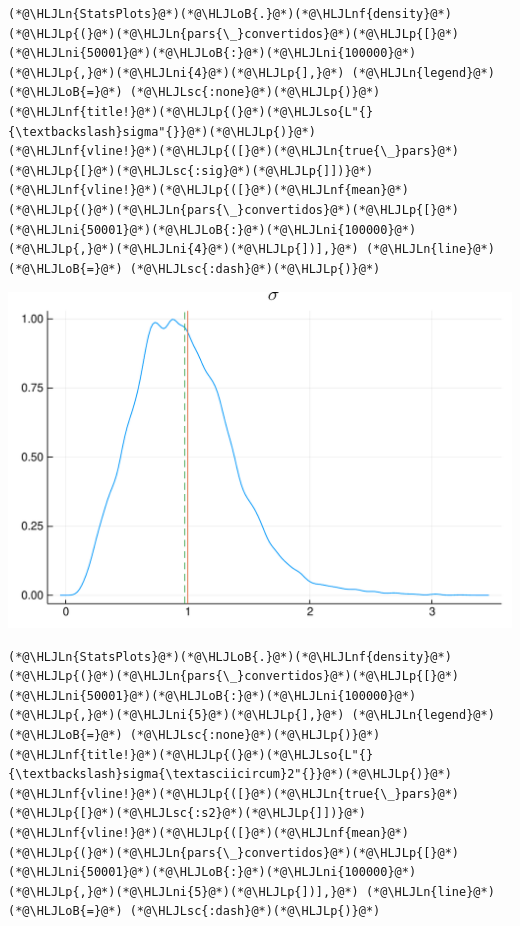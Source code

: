 \documentclass[12pt,a4paper]{article}
\newcommand{\HLJLn}[1]{#1}
\newcommand{\HLJLnf}[1]{\textcolor[RGB]{66,102,213}{#1}}
\newcommand{\HLJLsc}[1]{\textcolor[RGB]{201,61,57}{#1}}
\newcommand{\HLJLso}[1]{\textcolor[RGB]{201,61,57}{#1}}
\newcommand{\HLJLni}[1]{\textcolor[RGB]{59,151,46}{#1}}
\newcommand{\HLJLoB}[1]{\textcolor[RGB]{102,102,102}{\textbf{#1}}}
\newcommand{\HLJLp}[1]{#1}
\begin{document}
\begin{lstlisting}
(*@\HLJLn{StatsPlots}@*)(*@\HLJLoB{.}@*)(*@\HLJLnf{density}@*)(*@\HLJLp{(}@*)(*@\HLJLn{pars{\_}convertidos}@*)(*@\HLJLp{[}@*)(*@\HLJLni{50001}@*)(*@\HLJLoB{:}@*)(*@\HLJLni{100000}@*)(*@\HLJLp{,}@*)(*@\HLJLni{4}@*)(*@\HLJLp{],}@*) (*@\HLJLn{legend}@*) (*@\HLJLoB{=}@*) (*@\HLJLsc{:none}@*)(*@\HLJLp{)}@*)
(*@\HLJLnf{title!}@*)(*@\HLJLp{(}@*)(*@\HLJLso{L"{}{\textbackslash}sigma"{}}@*)(*@\HLJLp{)}@*)
(*@\HLJLnf{vline!}@*)(*@\HLJLp{([}@*)(*@\HLJLn{true{\_}pars}@*)(*@\HLJLp{[}@*)(*@\HLJLsc{:sig}@*)(*@\HLJLp{]])}@*)
(*@\HLJLnf{vline!}@*)(*@\HLJLp{([}@*)(*@\HLJLnf{mean}@*)(*@\HLJLp{(}@*)(*@\HLJLn{pars{\_}convertidos}@*)(*@\HLJLp{[}@*)(*@\HLJLni{50001}@*)(*@\HLJLoB{:}@*)(*@\HLJLni{100000}@*)(*@\HLJLp{,}@*)(*@\HLJLni{4}@*)(*@\HLJLp{])],}@*) (*@\HLJLn{line}@*) (*@\HLJLoB{=}@*) (*@\HLJLsc{:dash}@*)(*@\HLJLp{)}@*)
\end{lstlisting}

\includegraphics[width=\linewidth]{figures/dsge_and_julia_28_1.pdf}

\begin{lstlisting}
(*@\HLJLn{StatsPlots}@*)(*@\HLJLoB{.}@*)(*@\HLJLnf{density}@*)(*@\HLJLp{(}@*)(*@\HLJLn{pars{\_}convertidos}@*)(*@\HLJLp{[}@*)(*@\HLJLni{50001}@*)(*@\HLJLoB{:}@*)(*@\HLJLni{100000}@*)(*@\HLJLp{,}@*)(*@\HLJLni{5}@*)(*@\HLJLp{],}@*) (*@\HLJLn{legend}@*) (*@\HLJLoB{=}@*) (*@\HLJLsc{:none}@*)(*@\HLJLp{)}@*)
(*@\HLJLnf{title!}@*)(*@\HLJLp{(}@*)(*@\HLJLso{L"{}{\textbackslash}sigma{\textasciicircum}2"{}}@*)(*@\HLJLp{)}@*)
(*@\HLJLnf{vline!}@*)(*@\HLJLp{([}@*)(*@\HLJLn{true{\_}pars}@*)(*@\HLJLp{[}@*)(*@\HLJLsc{:s2}@*)(*@\HLJLp{]])}@*)
(*@\HLJLnf{vline!}@*)(*@\HLJLp{([}@*)(*@\HLJLnf{mean}@*)(*@\HLJLp{(}@*)(*@\HLJLn{pars{\_}convertidos}@*)(*@\HLJLp{[}@*)(*@\HLJLni{50001}@*)(*@\HLJLoB{:}@*)(*@\HLJLni{100000}@*)(*@\HLJLp{,}@*)(*@\HLJLni{5}@*)(*@\HLJLp{])],}@*) (*@\HLJLn{line}@*) (*@\HLJLoB{=}@*) (*@\HLJLsc{:dash}@*)(*@\HLJLp{)}@*)
\end{lstlisting}
\end{document}
